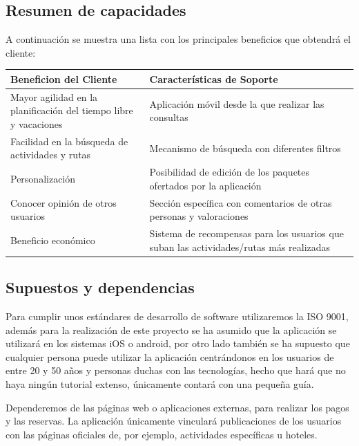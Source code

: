 \documentclass[11pt]{article}
\begin{document}
\subsection{Resumen de capacidades}
A continuación se muestra una lista con los principales beneficios que obtendrá el cliente:

\begin{table}[H]
	\centering
	\begin{tabular}{p{0.4\linewidth}p{0.6\linewidth}}
		\toprule
		\textbf{Beneficion del Cliente} & \textbf{Características de Soporte} \\
		\midrule
		Mayor agilidad en la planificación del tiempo libre y vacaciones & Aplicación móvil desde la que realizar las consultas \\
		Facilidad en la búsqueda de actividades y rutas & Mecanismo de búsqueda con diferentes filtros \\
		Personalización & Posibilidad de edición de los paquetes ofertados por la aplicación \\
		Conocer opinión de otros usuarios & Sección específica con comentarios de otras personas y valoraciones\\
		Beneficio económico & Sistema de recompensas para los usuarios que suban las actividades/rutas más realizadas \\
		
		\bottomrule
	\end{tabular}
\end{table}

\subsection{Supuestos y dependencias}

Para cumplir unos estándares de desarrollo de software utilizaremos la ISO 9001, además para la realización de este proyecto se ha asumido que la aplicación  se utilizará en los sistemas iOS o android, por otro lado también se ha supuesto que cualquier persona puede utilizar la aplicación centrándonos en los usuarios de entre 20 y 50 años y personas duchas con las tecnologías, hecho que hará que no haya ningún tutorial extenso, únicamente contará con una pequeña guía.

Dependeremos de las páginas web o aplicaciones externas, para realizar los pagos y las reservas. La aplicación únicamente vinculará publicaciones de los usuarios con las páginas oficiales de, por ejemplo, actividades específicas u hoteles. 
\end{document}
